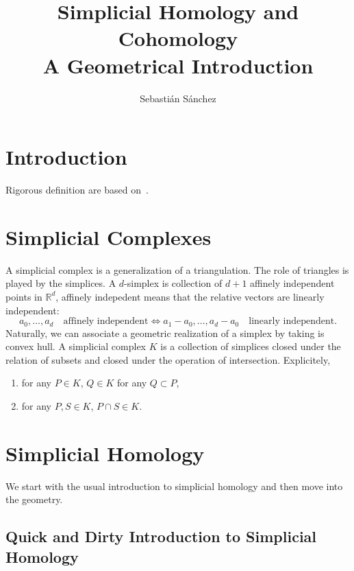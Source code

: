 \documentclass{article}
\title{Simplicial Homology and Cohomology\\ A Geometrical Introduction}
\author{Sebastián Sánchez}
\newcommand{\R}{\mathbb R}
\begin{document}
\maketitle

\section{Introduction}

Rigorous definition are based on~\cite{munkres}.

\section{Simplicial Complexes}

A simplicial complex is a generalization of a triangulation. The role of triangles is
played by the simplices. A \(d\)-simplex is collection of \(d+1\) affinely independent points
in \(\R^{d}\), affinely indepedent means that the relative vectors are linearly independent:
\begin{displaymath}
  a_0, \dots, a_d \quad\textrm{affinely independent}
  \iff
  a_1-a_0, \dots, a_d-a_0 \quad\textrm{linearly independent}.
\end{displaymath}
Naturally, we can associate a geometric realization of a simplex by taking is convex hull.
A simplicial complex \(K\) is a collection of simplices closed under the relation of subsets and 
closed under the operation of intersection. Explicitely,
\begin{enumerate}
  \item for any \(P\in K\), \(Q\in K\) for any \(Q\subset P\),
  \item for any \(P, S\in K\), \(P\cap S \in K\).
\end{enumerate}

\section{Simplicial Homology}

We start with the usual introduction to simplicial homology and then move into
the geometry.

\subsection{Quick and Dirty Introduction to Simplicial Homology}
\end{document}
